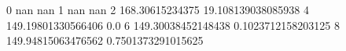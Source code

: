 0 nan nan
1 nan nan
2 168.30615234375 19.108139038085938
4 149.19801330566406 0.0
6 149.30038452148438 0.1023712158203125
8 149.94815063476562 0.7501373291015625
